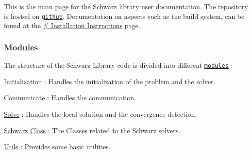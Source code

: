 This is the main page for the Schwarz library user documentation. The repository is hosted on \href{https://github.com/pratikvn/schwarz-lib}{\tt github}. Documentation on aspects such as the build system, can be found at the \hyperlink{install_schwarz}{\# Installation Instructions} page.

\subsubsection*{Modules}

The structure of the Schwarz Library code is divided into different \href{modules.html}{\tt modules} \+:


\begin{DoxyItemize}
\item \hyperlink{group__init}{Initialization} \+: Handles the initialization of the problem and the solver.
\item \hyperlink{group__comm}{Communicate} \+: Handles the communication.
\item \hyperlink{group__solve}{Solve} \+: Handles the local solution and the convergence detection.
\item \hyperlink{group__schwarz__class}{Schwarz Class} \+: The Classes related to the Schwarz solvers.
\item \hyperlink{group__utils}{Utils} \+: Provides some basic utilities. 
\end{DoxyItemize}